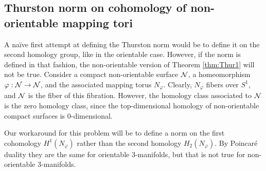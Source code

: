 \subsection{Thurston norm on cohomology of non-orientable mapping tori}
\label{sec:thurst-norm-cohom}

A na\"ive first attempt at defining the Thurston norm would be to define it on the second homology group, like in the orientable case.
However, if the norm is defined in that fashion, the non-orientable version of Theorem \ref{thm:Thur1} will not be true.
Consider a compact non-orientable surface $\mathcal{N}$, a homeomorphism $\varphi: \mathcal{N} \to \mathcal{N}$, and the associated mapping torus $N_{\varphi}$.
Clearly, $N_{\varphi}$ fibers over $S^1$, and $\mathcal{N}$ is the fiber of this fibration.  However, the homology class associated to $\mathcal{N}$ is the zero homology class, since the top-dimensional homology of non-orientable compact surfaces is $0$-dimensional.

Our workaround for this problem will be to define a norm on the first cohomology $H^1(N_{\varphi})$ rather than the second homology $H_2(N_{\varphi})$.
By Poincar\'e duality they are the same for orientable 3-manifolds, but that is not true for non-orientable $3$-manifolds.






